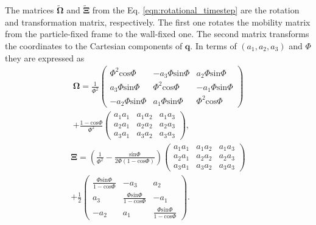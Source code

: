 \documentclass{master_thesis}
\begin{document}
The matrices $\tilde{\bm{\Omega}}$ and $\tilde{\bm{\Xi}}$ from the Eq. \eqref{eqn:rotational_timestep} are the rotation and transformation matrix, respectively. The first one rotates the mobility matrix from the particle-fixed frame to the wall-fixed one. The second matrix transforms the coordinates to the Cartesian components of $\boldsymbol{q}$. In terms of $(a_1,a_2,a_3)$ and $\Phi$ they are expressed as
\begin{equation}
    \begin{split}
    \bm{\Omega}=\frac{1}{\Phi^2}
    \begin{pmatrix}
    \Phi^2\textrm{cos}\Phi & -a_3\Phi\textrm{sin}\Phi & a_2\Phi\textrm{sin}\Phi\\
    a_3\Phi\textrm{sin}\Phi & \Phi^2\textrm{cos}\Phi & -a_1\Phi\textrm{sin}\Phi\\
    -a_2\Phi\textrm{sin}\Phi & a_1\Phi\textrm{sin}\Phi & \Phi^2\textrm{cos}\Phi
    \end{pmatrix}\\
    +\frac{1-\textrm{cos}\Phi}{\Phi^2}
    \begin{pmatrix}
    a_1a_1 & a_1a_2 & a_1a_3\\
    a_2a_1 & a_2a_2 & a_2a_3\\
    a_3a_1 & a_3a_2 & a_3a_3
    \end{pmatrix},
    \end{split}
\label{eqn:omega}
\end{equation}
\begin{equation}
    \begin{split}
    \bm{\Xi}=\left(\frac{1}{\Phi^2}-\frac{\textrm{sin}\Phi}{2\Phi(1-\textrm{cos}\Phi)}\right)
    \begin{pmatrix}
    a_1a_1 & a_1a_2 & a_1a_3\\
    a_2a_1 & a_2a_2 & a_2a_3\\
    a_3a_1 & a_3a_2 & a_3a_3
    \end{pmatrix}\\
    +\frac{1}{2}
    \begin{pmatrix}
    \frac{\Phi\textrm{sin}\Phi}{1-\textrm{cos}\Phi} & -a_3 & a_2\\
    a_3 & \frac{\Phi\textrm{sin}\Phi}{1-\textrm{cos}\Phi} & -a_1\\
    -a_2 & a_1 & \frac{\Phi\textrm{sin}\Phi}{1-\textrm{cos}\Phi}
    \end{pmatrix}.
    \end{split}
\label{eqn:xi}
\end{equation}
\end{document}
